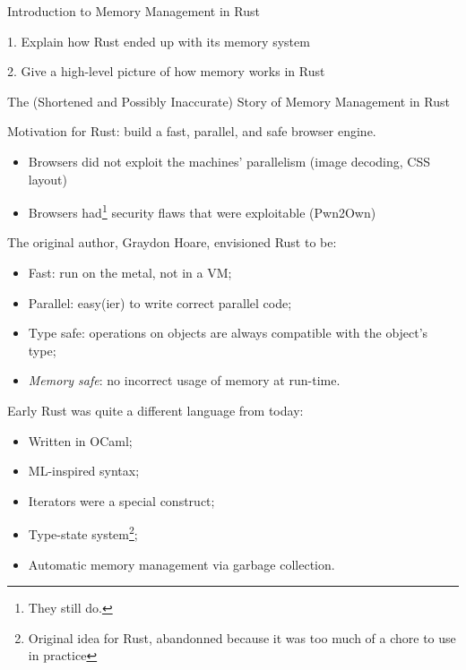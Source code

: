 \documentclass[9pt]{beamer}
\renewcommand\big[1]{
  \begin{center}
    \Large{#1}
  \end{center}
}
\begin{document}
\begin{frame}[plain]
  \centering\Huge{Introduction to Memory Management in Rust}
\end{frame}

\begin{frame}
  \big{1. Explain how Rust ended up with its memory system}

  \big{2. Give a high-level picture of how memory works in Rust}
\end{frame}

\begin{frame}
  \centering\Huge{The (Shortened and Possibly Inaccurate) Story of Memory Management in Rust}
\end{frame}

\begin{frame}
  \big{Motivation for Rust: build a fast, parallel, and safe browser engine.}

  \begin{itemize}
    \item Browsers did not exploit the machines' parallelism (image decoding, CSS layout)
    \item Browsers had\footnote{They still do.} security flaws that were exploitable (Pwn2Own)
  \end{itemize}
\end{frame}

\begin{frame}
  \big{The original author, Graydon Hoare, envisioned Rust to be:}

  \begin{itemize}
    \item Fast: run on the metal, not in a VM;
    \item Parallel: easy(ier) to write correct parallel code;
    \item Type safe: operations on objects are always compatible with the object's type;
    \item \emph{Memory safe}: no incorrect usage of memory at run-time.
  \end{itemize}
\end{frame}

\begin{frame}
  \big{Early Rust was quite a different language from today:}

  \begin{itemize}
    \item Written in OCaml;
    \item ML-inspired syntax;
    \item Iterators were a special construct;
    \item Type-state system\footnote{Original idea for Rust, abandonned because it was too much of a chore to use in practice};
    \item Automatic memory management via garbage collection.
  \end{itemize}
\end{frame}
\end{document}
